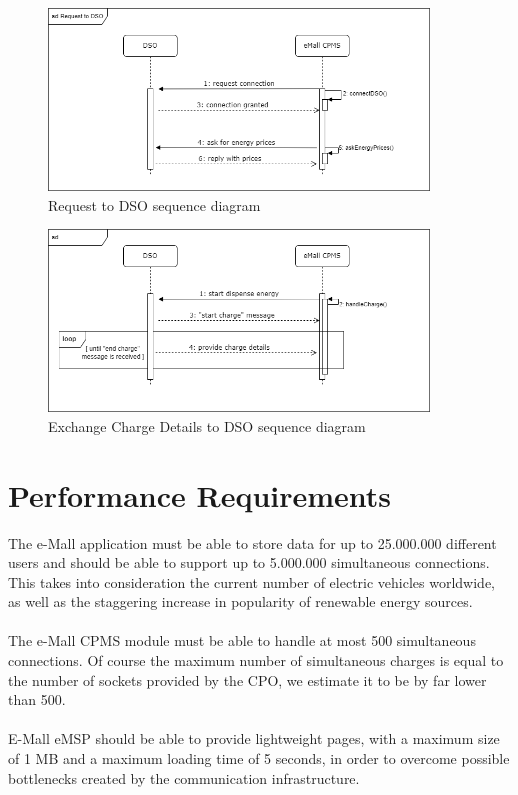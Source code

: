\documentclass[12pt]{report}
\begin{document}
    \begin{figure}[h]
        \centering
        \includegraphics[width = 0.9\textwidth]{assets/request_to_dso.png}
        \caption{Request to DSO sequence diagram}
    \end{figure}

    \begin{figure}
        \centering
        \includegraphics[width = 0.9\textwidth]{assets/exchange_chargr_details_DSO.png}
        \caption{Exchange Charge Details to DSO sequence diagram}
    \end{figure}
\clearpage




\section{Performance Requirements}
The e-Mall application must be able to store data for up to 25.000.000 different users and should be able to support up to 5.000.000 simultaneous connections. This takes into consideration the current number of electric vehicles worldwide, as well as the staggering increase in popularity of renewable energy sources.\\\\
The e-Mall CPMS module must be able to handle at most 500 simultaneous connections. Of course the maximum number of simultaneous charges is equal to the number of sockets provided by the CPO, we estimate it to be by far lower than 500.\\\\
E-Mall eMSP should be able to provide lightweight pages, with a maximum size of 1 MB and a maximum loading time of 5 seconds, in order to overcome possible bottlenecks created by the communication infrastructure.
\end{document}
